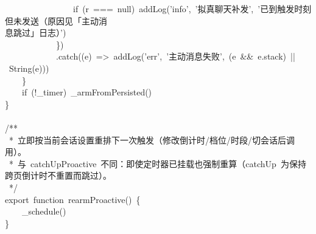 \documentclass[a4paper,10pt]{article}
\begin{document}
{~~~~~~~~~~~~~~~~if~(r~===~null)~addLog('info',~'拟真聊天补发',~'已到触发时刻但未发送（原因见「主动消\\
息跳过」日志）')\\
~~~~~~~~~~~~\})\\
~~~~~~~~~~~~.catch((e)~=>~addLog('err',~'主动消息失败',~(e~\&\&~e.stack)~||~String(e)))\\
~~~~\}\\
~~~~if~(!\_timer)~\_armFromPersisted()\\
\}\\
\mbox{}\\
/**\\
~*~立即按当前会话设置重排下一次触发（修改倒计时/档位/时段/切会话后调用）。\\
~*~与~catchUpProactive~不同：即使定时器已挂载也强制重算（catchUp~为保持跨页倒计时不重置而跳过）。\\
~*/\\
export~function~rearmProactive()~\{\\
~~~~\_schedule()\\
\}\\
\mbox{}
}

\newpage
\end{document}
